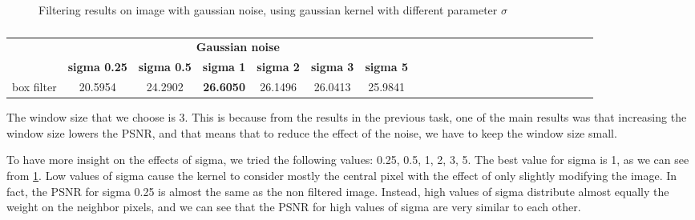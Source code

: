 \documentclass{article}
\begin{document}
\begin{figure}[h]
        \centering
    \caption{ Filtering results on image with gaussian noise, using gaussian kernel with different parameter $\sigma$}
    \\
    \label{fig:awb}
\end{figure}

\begin{table}
	\centering
	\captionsetup{justification=centering}
	\renewcommand{\arraystretch}{1.5}
	\setlength{\abovecaptionskip}{15pt plus 3pt minus 2pt} %
	\begin{tabular}{|c|c|c|c|c|c|c|c|c|c|c|c|c|c|c|c|c|c|c|c|c|c|c|}
		\hline
		& \multicolumn{6}{c|}{\textbf{Gaussian noise}}   \\
		& \textbf{sigma 0.25} &\textbf{sigma 0.5} & \textbf{sigma 1} & \textbf{sigma 2} & \textbf{sigma 3} & \textbf{sigma 5}  \\
		\hline
	box filter     & 20.5954 &  24.2902  & \textbf{26.6050}  & 26.1496 &  26.0413 & 25.9841   \\  \hline

	
	\end{tabular}

	\caption{}
	\label{tab:gauss_gauss}
\end{table}

The window size that we choose is 3. This is because from the results in the previous task, one of the main results was that increasing the window size lowers the PSNR, and that means that to reduce the effect of the noise, we have to keep the window size small.

To have more insight on the effects of sigma, we tried the following values: 0.25, 0.5, 1, 2, 3, 5. The best value for sigma is 1, as we can see from \cref{tab:gauss_gauss}. Low values of sigma cause the kernel to consider mostly the central pixel with the effect of only slightly modifying the image. In fact, the PSNR for sigma 0.25 is almost the same as the non filtered image. Instead, high values of sigma distribute almost equally the weight on the neighbor pixels, and we can see that the PSNR for high values of sigma are very similar to each other.
\end{document}
